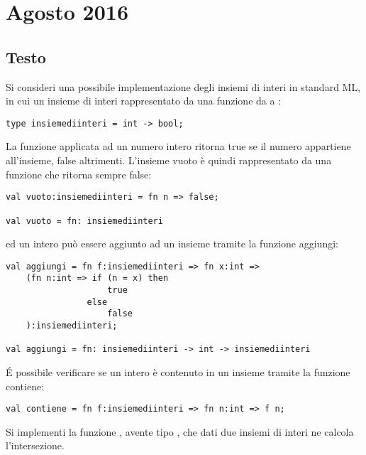 \section{Agosto 2016}

\subsection{Testo}

Si consideri una possibile implementazione degli insiemi di interi in standard ML, in cui un insieme di interi  rappresentato da una funzione da  a :

\begin{lstlisting}[style = SML, caption = {Definizione del tipo di dato \sml{insiemidiinteri}}]
type insiemediinteri = int -> bool;
\end{lstlisting}

La funzione applicata ad un numero intero ritorna true se il numero appartiene all'insieme, false altrimenti. L'insieme vuoto è quindi rappresentato da una funzione che ritorna sempre false:

\begin{lstlisting}[style = SML, caption = {Definizione della funzione \sml{vuoto}}]
val vuoto:insiemediinteri = fn n => false;

val vuoto = fn: insiemediinteri
\end{lstlisting}

ed un intero può essere aggiunto ad un insieme tramite la funzione aggiungi:

\begin{lstlisting}[style = SML, caption = {Definizione della funzione \sml{aggiungi}}]
val aggiungi = fn f:insiemediinteri => fn x:int =>
	(fn n:int => if (n = x) then
					true
				else
					false
	):insiemediinteri;

val aggiungi = fn: insiemediinteri -> int -> insiemediinteri
\end{lstlisting}

\'E possibile verificare se un intero è contenuto in un insieme tramite la funzione contiene:

\begin{lstlisting}[style = SML, caption = {Definizione della funzione \sml{contiene}}]
val contiene = fn f:insiemediinteri => fn n:int => f n;
\end{lstlisting}

Si implementi la funzione , avente tipo , che dati due insiemi di interi ne calcola l'intersezione.

